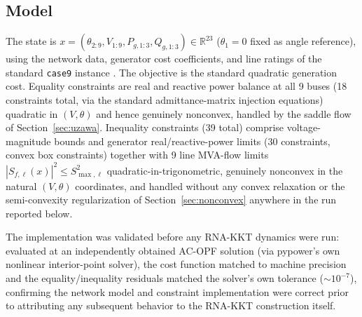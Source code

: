 \documentclass[11pt,onecolumn]{article}
\theoremstyle{definition}
\theoremstyle{remark}
\begin{document}
\subsection{Model}
The state is $x = (\theta_{2:9}, V_{1:9}, P_{g,1:3}, Q_{g,1:3}) \in \mathbb{R}^{23}$
($\theta_1 = 0$ fixed as angle reference), using the network data, generator cost coefficients,
and line ratings of the standard \texttt{case9} instance \cite{zimmerman2011}. The objective is
the standard quadratic generation cost. Equality constraints are real and reactive power
balance at all 9 buses (18 constraints total, via the standard admittance-matrix injection
equations) quadratic in $(V, \theta)$ and hence genuinely nonconvex, handled by the saddle
flow of Section~\ref{sec:uzawa}. Inequality constraints (39 total) comprise voltage-magnitude
bounds and generator real/reactive-power limits (30 constraints, convex box constraints)
together with 9 line MVA-flow limits $|S_{f,\ell}(x)|^2 \le S_{\max,\ell}^2$
quadratic-in-trigonometric, genuinely nonconvex in the natural $(V, \theta)$ coordinates, and
handled without any convex relaxation or the semi-convexity regularization of
Section~\ref{sec:nonconvex} anywhere in the run reported below.

The implementation was validated before any RNA-KKT dynamics were run: evaluated at an
independently obtained AC-OPF solution (via pypower's own nonlinear interior-point solver), the
cost function matched to machine precision and the equality/inequality residuals matched the
solver's own tolerance ($\sim 10^{-7}$), confirming the network model and constraint
implementation were correct prior to attributing any subsequent behavior to the RNA-KKT
construction itself.
\end{document}
